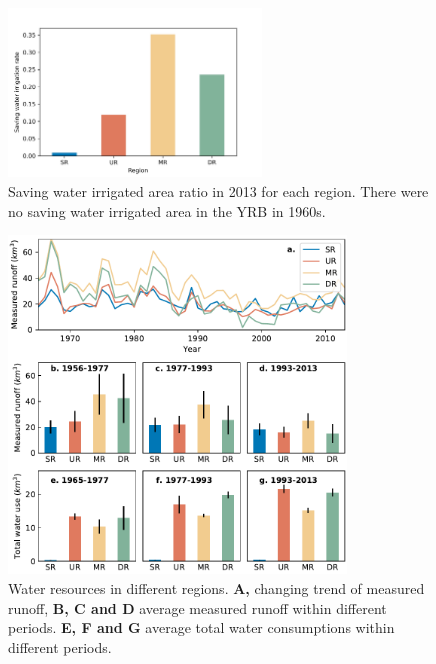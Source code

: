 \documentclass[9pt,twoside,lineno]{pnas-new}
\begin{document}
\begin{figure}
    \centering
    \includegraphics[width=0.6\textwidth]{../../figures/sup/saving_water.jpg}
    \caption{
        Saving water irrigated area ratio in 2013 for each region. There were no saving water irrigated area in  the YRB in 1960s.
    }
\end{figure}


\begin{figure}
    \centering
    \includegraphics[width=0.8\textwidth]{../../figures/sup/sf_measured_runoff.pdf}
    \caption{Water resources in different regions. 
        \textbf{A,} changing trend of measured runoff, 
        \textbf{B, C and D} average measured runoff within different periods.
        \textbf{E, F and G} average total water consumptions within different periods. 
    }
\end{figure}
\end{document}
